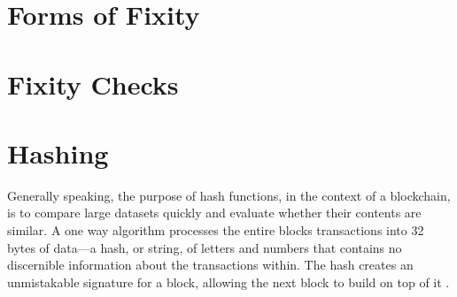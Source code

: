 \section{Forms of Fixity}
\section{Fixity Checks}
\section{Hashing}
Generally speaking, the purpose of hash functions, in the context of a blockchain, is to compare large datasets quickly and evaluate whether their contents are similar. A one way algorithm processes the entire blocks transactions into 32 bytes of data—a hash, or string, of letters and numbers that contains no discernible information about the transactions within. The hash creates an unmistakable signature for a block, allowing the next block to build on top of it \cite[55]{dannen2017introducing}.